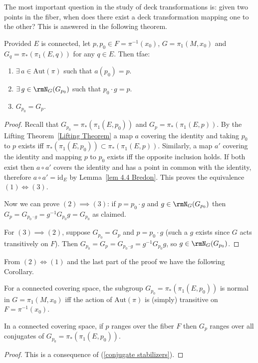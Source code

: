 The most important question in the study of deck transformations is: given two points in the fiber, when does there exist a deck transformation mapping one to the other? This is answered in the following theorem.
\begin{thm}\label{thm 6.3 Bredon}
    Provided $E$ is connected, let $p,p_0\in F=\pi^{-1}(x_0)$, $G=\pi_1(M,x_0)$ and $G_{q}=\pi_\ast(\pi_1(E,q))$ for any $q\in E$. Then \gls{tfae}:
    \begin{enumerate}[label=(\arabic*)]
        \item $\exists\, a\in \mathrm{Aut}(\pi)$ such that $a(p_0)=p$.
        \item $\exists\, g\in \rmN_G(G_{p_0})$ such that $p_0\cdot g=p$.
        \item $G_{p_0}=G_p$.
    \end{enumerate}
\end{thm}
\begin{proof}
    Recall that $G_{p_0}=\pi_\ast(\pi_1(E,p_0))$ and $G_{p}=\pi_\ast(\pi_1(E,p))$. By the Lifting Theorem~\ref{Lifting Theorem} a map $a$ covering the identity and taking $p_0$ to $p$ exists iff $\pi_\ast(\pi_1(E,p_0))\subset \pi_\ast(\pi_1(E,p))$. Similarly, a map $a'$ covering the identity and mapping $p$ to $p_0$ exists iff the opposite inclusion holds. If both exist then $a\circ a'$ covers the identity and has a point in common with the identity, therefore $a\circ a'=\mathrm{id}_E$ by Lemma~\ref{lem 4.4 Bredon}. This proves the equivalence $(1)\Leftrightarrow (3)$.

    Now we can prove $(2)\implies(3)$: if $p=p_0\cdot g$ and $g\in \rmN_G(G_{p_0})$ then $G_p=G_{p_0\cdot g}=g^{-1}G_{p_0}g=G_{p_0}$ as claimed.

    For $(3)\implies (2)$, suppose $G_{p_0}=G_p$ and $p=p_0\cdot g$ (such a $g$ exists since $G$ acts transitively on $F$). Then $G_{p_0}=G_p=G_{p_0\cdot g}=g^{-1}G_{p_0}g$, so $g\in \rmN_G(G_{p_0})$.
\end{proof}
From $(2)\Leftrightarrow(1)$ and the last part of the proof we have the following Corollary.
\begin{cor}\label{cor 6.4 Bredon}
    For a connected covering space, the subgroup $G_{p_0}=\pi_\ast(\pi_1(E,p_0))$ is normal in $G=\pi_1(M,x_0)$ iff the action of $\mathrm{Aut}(\pi)$ is (simply) transitive on $F=\pi^{-1}(x_0)$.
\end{cor}
\begin{cor}\label{cor 6.5 Bredon}
    In a connected covering space, if $p$ ranges over the fiber $F$ then $G_p$ ranges over all conjugates of $G_{p_0}=\pi_\ast(\pi_1(E,p_0))$.
\end{cor}
\begin{proof}
    This is a consequence of (\ref{conjugate stabilizers}).
\end{proof}


